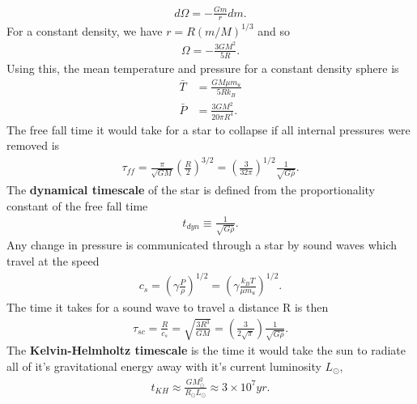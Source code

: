 \begin{multicols}{2}
\begin{align}
	d\Omega = -\frac{Gm}{r}dm.
\end{align}
For a constant density, we have $r=R(m/M)^{1/3}$ and so
\begin{align}
	\Omega = -\frac{3GM^2}{5R}.
\end{align}
Using this, the mean temperature and pressure for a constant density sphere is
\begin{align}
	\bar{T} &= \frac{GM\mu m_u}{5Rk_B} \\
	\bar{P} &= \frac{3GM^2}{20\pi R^4}.
\end{align}
The free fall time it would take for a star to collapse if all internal pressures were removed is \begin{align}
	\tau_{ff} = \frac{\pi}{\sqrt{GM}}\left(\frac{R}{2}\right)^{3/2} = \left(\frac{3}{32\pi}\right)^{1/2}\frac{1}{\sqrt{G\bar{\rho}}}.
\end{align}
The \textbf{dynamical timescale} of the star is defined from the proportionality constant of the free fall time
\begin{align}
	t_{dyn} \equiv \frac{1}{\sqrt{G\bar{\rho}}}.
\end{align}
Any change in pressure is communicated through a star by sound waves which travel at the speed
\begin{align}
	c_s = \left(\gamma \frac{P}{\rho}\right)^{1/2}=\left(\gamma \frac{k_BT}{\mu m_u}\right)^{1/2}.
\end{align}
The time it takes for a sound wave to travel a distance R is then
\begin{align}
	\tau_{sc} = \frac{R}{c_s} = \sqrt{\frac{3R^3}{GM}} = \left(\frac{3}{2\sqrt{\pi}}\right)\frac{1}{\sqrt{G\bar{\rho}}}.
\end{align}
The \textbf{Kelvin-Helmholtz timescale} is the time it would take the sun to radiate all of it's gravitational energy away with it's current luminosity $L_\odot$,
\begin{align}
	t_{KH} \approx \frac{GM_\odot^2}{R_\odot L_\odot} \approx 3 \times 10^7 yr.
\end{align}

\end{multicols}
